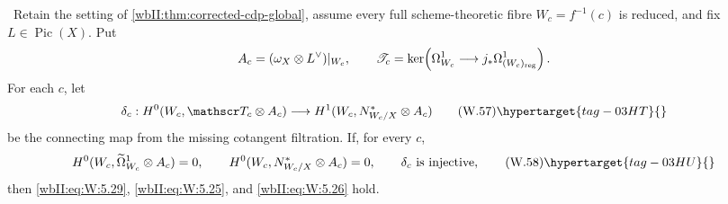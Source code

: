 \begin{theorem}
\hypertarget{tag-03IZ}{}\label{wbII:thm:corrected-cdp-fibrewise}


\ Retain the setting of
\cref{wbII:thm:corrected-cdp-global}, assume every full scheme-theoretic fibre
\(W_c=f^{-1}(c)\) is reduced, and fix \(L\in\operatorname{Pic}(X)\).  Put
\[
 A_c=(\omega_X\otimes L^\vee)|_{W_c},\qquad
 \mathscr T_c=\ker\!\left(
 \Omega^1_{W_c}\longrightarrow
 j_*\Omega^1_{(W_c)_{\rm reg}}\right).
\]
For each \(c\), let
\[
 \delta_c:
 H^0(W_c,\mathscr T_c\otimes A_c)
 \longrightarrow
 H^1(W_c,N^*_{W_c/X}\otimes A_c)
\tag{W.57}\hypertarget{tag-03HT}{}\label{wbII:eq:W:5.30}
\]
be the connecting map from the missing cotangent filtration.  If, for every
\(c\),
\[
 H^0(W_c,\widetilde\Omega^1_{W_c}\otimes A_c)=0,\qquad
 H^0(W_c,N^*_{W_c/X}\otimes A_c)=0,\qquad
 \delta_c\ \text{is injective},
\tag{W.58}\hypertarget{tag-03HU}{}\label{wbII:eq:W:5.31}
\]
then \eqref{wbII:eq:W:5.29}, \eqref{wbII:eq:W:5.25}, and \eqref{wbII:eq:W:5.26} hold.
\end{theorem}
